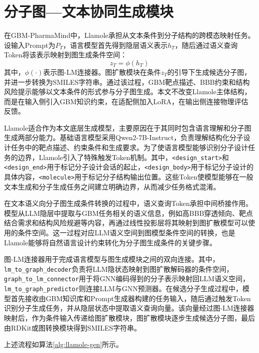 \section{分子图—文本协同生成模块}\label{sec:llamole-arch}

在GBM-PharmaMind中，Llamole承担从文本条件到分子结构的跨模态映射任务。设输入Prompt为$P_T$，语言模型首先得到隐层语义表示$h_T$，随后通过语义查询Token将该表示映射到图生成条件空间：
$$z_T = \phi(h_T)$$
其中，$\phi(\cdot)$表示图-LM连接器。图扩散模块在条件$z_T$的引导下生成候选分子图，并进一步转换为SMILES字符串。通过该过程，GBM靶点描述、BBB约束和结构风险提示能够以文本条件的形式参与分子图生成。本文不改变Llamole主体结构，而是在输入侧引入GBM知识约束，在适配侧加入LoRA，在输出侧连接物理评估反馈。

Llamole适合作为本文底层生成模型，主要原因在于其同时包含语言理解和分子图生成两部分能力。基础语言模型采用Qwen2-7B-Instruct\cite{Qwen2Team2024}，负责理解结构化分子设计任务中的靶点描述、约束条件和生成要求。为了使语言模型能够识别分子设计任务的边界，Llamole引入了特殊触发Token机制\cite{liu2025multimodal}。其中，\texttt{<design\_start>}和\texttt{<design\_end>}用于标记分子设计会话的起止，\texttt{<design\_body>}用于标记分子设计的具体内容，\texttt{<molecule>}用于标记分子结构输出位置。这些Token使模型能够在一般文本生成和分子生成任务之间建立明确边界，从而减少任务格式混淆。

在文本语义向分子图生成条件转换的过程中，语义查询Token承担中间桥接作用。模型从LLM隐层中提取与GBM任务相关的语义信息，例如高BBB穿透倾向、靶点结合需求和结构风险规避等内容，再通过线性投影层将其映射到图扩散模型可以使用的条件空间\cite{liu2025multimodal}。这一过程对应LLM语义空间到图模型条件空间的转换，也是Llamole能够将自然语言设计约束转化为分子图生成条件的关键步骤。

图-LM连接器用于完成语言模型与图生成模块之间的双向连接。其中，\texttt{lm\_to\_graph\_decoder}负责将LLM隐状态映射到图扩散解码器的条件空间，\texttt{graph\_to\_lm\_connector}用于将GNN编码得到的分子表示映射回LLM语义空间，\texttt{lm\_to\_graph\_predictor}则连接LLM与GNN预测器\cite{liu2025multimodal}。在候选分子生成过程中，模型首先接收由GBM知识库和Prompt生成器构建的任务输入，随后通过触发Token识别分子生成任务，并从隐层状态中提取语义查询向量。该向量经过图-LM连接器映射后，作为条件输入传递给图扩散模块，图扩散模块逐步生成候选分子图，最后由RDKit或图转换模块得到SMILES字符串。

上述流程如算法\ref{alg:llamole-gen}所示。

